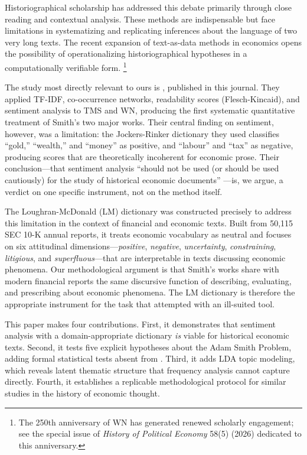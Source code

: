 \documentclass[12pt,a4paper]{article}
\begin{document}
Historiographical scholarship has addressed this debate primarily through
close reading and contextual analysis.
These methods are indispensable but face limitations in systematizing and
replicating inferences about the language of two very long texts.
The recent expansion of text-as-data methods in economics
\citep{Gentzkow2019} opens the possibility of operationalizing
historiographical hypotheses in a computationally verifiable form.%
\footnote{The 250th anniversary of WN has generated renewed scholarly
  engagement; see the special issue of \textit{History of Political
  Economy} 58(5) (2026) dedicated to this anniversary.}

The study most directly relevant to ours is \citet{Ballandonne2023},
published in this journal.
They applied TF-IDF, co-occurrence networks, readability scores
(Flesch-Kincaid), and sentiment analysis to TMS and WN, producing the
first systematic quantitative treatment of Smith's two major works.
Their central finding on sentiment, however, was a limitation: the
Jockers-Rinker dictionary they used classifies ``gold,'' ``wealth,'' and
``money'' as positive, and ``labour'' and ``tax'' as negative, producing
scores that are theoretically incoherent for economic prose.
Their conclusion---that sentiment analysis ``should not be used (or
should be used cautiously) for the study of historical economic
documents'' \citep[p.~23]{Ballandonne2023}---is, we argue, a verdict
on one specific instrument, not on the method itself.

The Loughran-McDonald (LM) dictionary \citep{LoughranMcDonald2011} was
constructed precisely to address this limitation in the context of
financial and economic texts.
Built from 50,115 SEC 10-K annual reports, it treats economic vocabulary
as neutral and focuses on six attitudinal dimensions---\textit{positive},
\textit{negative}, \textit{uncertainty}, \textit{constraining},
\textit{litigious}, and \textit{superfluous}---that are interpretable in
texts discussing economic phenomena.
Our methodological argument is that Smith's works share with modern
financial reports the same discursive function of describing, evaluating,
and prescribing about economic phenomena.
The LM dictionary is therefore the appropriate instrument for the task
that \citeauthor{Ballandonne2023} attempted with an ill-suited tool.

This paper makes four contributions.
First, it demonstrates that sentiment analysis with a domain-appropriate
dictionary \textit{is} viable for historical economic texts.
Second, it tests five explicit hypotheses about the Adam Smith Problem,
adding formal statistical tests absent from \citeauthor{Ballandonne2023}.
Third, it adds LDA topic modeling, which reveals latent thematic structure
that frequency analysis cannot capture directly.
Fourth, it establishes a replicable methodological protocol for similar
studies in the history of economic thought.
\end{document}
